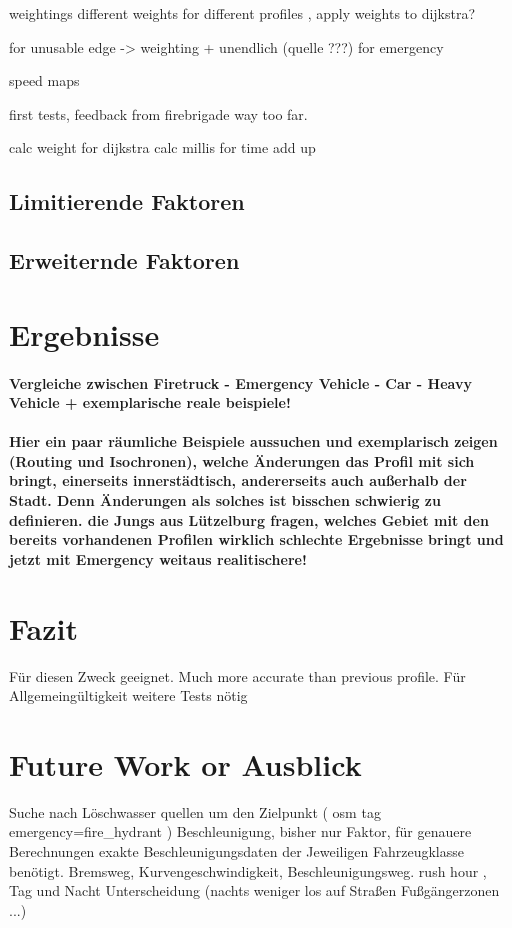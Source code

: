 \documentclass[10pt,a4paper]{article}
\begin{document}
weightings 
 different weights for different profiles , apply weights to dijkstra?
 
 for unusable edge -> weighting + unendlich (quelle ???)
 for emergency 
 
speed maps

first tests, feedback from firebrigade
way too far.

calc weight for dijkstra
calc millis for time add up



\subsection{Limitierende Faktoren}

\subsection{Erweiternde Faktoren}

\section{Ergebnisse}
\paragraph{
Vergleiche zwischen Firetruck - Emergency Vehicle - Car - Heavy Vehicle
+ exemplarische reale beispiele!
}
\paragraph{
\color{red}
Hier ein paar räumliche Beispiele aussuchen und exemplarisch zeigen (Routing und Isochronen), welche Änderungen das Profil mit sich bringt, einerseits innerstädtisch, andererseits auch außerhalb der Stadt. Denn Änderungen als solches ist bisschen schwierig zu definieren. die Jungs aus Lützelburg fragen, welches Gebiet mit den bereits vorhandenen Profilen wirklich schlechte Ergebnisse bringt und jetzt mit Emergency weitaus realitischere!
}

\section{Fazit}

Für diesen Zweck geeignet.
Much more accurate than previous profile. 
Für Allgemeingültigkeit weitere Tests nötig



\section{Future Work or Ausblick}

Suche nach Löschwasser quellen um den Zielpunkt ( osm tag emergency=fire\_hydrant )
Beschleunigung, bisher nur Faktor, für genauere Berechnungen exakte Beschleunigungsdaten der Jeweiligen Fahrzeugklasse benötigt. Bremsweg, Kurvengeschwindigkeit, Beschleunigungsweg.
rush hour , Tag und Nacht Unterscheidung (nachts weniger los auf Straßen\/ Fußgängerzonen ...)

\printbibliography
\end{document}
